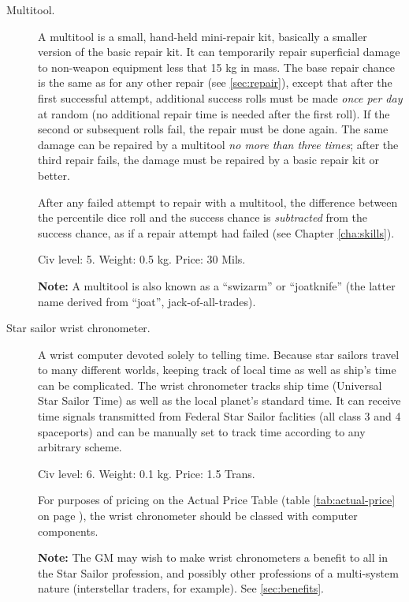 \begin{description}
\item[Multitool.] A multitool is a small, hand-held mini-repair kit,
  basically a smaller version of the basic repair kit.  It can
  temporarily repair superficial damage to non-weapon equipment less
  that 15 kg in mass.  The base repair chance is the same as for any
  other repair (see \ref{sec:repair}), except that after the first
  successful attempt, additional success rolls must be made \emph{once
    per day} at random (no additional repair time is needed after the
  first roll). If the second or subsequent rolls fail, the repair must
  be done again. The same damage can be repaired by a multitool
  \emph{no more than three times}; after the third repair fails, the
  damage must be repaired by a basic repair kit or better.

  After any failed attempt to repair with a multitool, the difference
  between the percentile dice roll and the success chance is
  \emph{subtracted} from the success chance, as if a repair attempt
  had failed (see Chapter \ref{cha:skills}).

  Civ level: 5.  Weight:
  0.5 kg.  Price: 30 Mils.

  \textbf{Note:} A multitool is also known as a ``swizarm'' or
  ``joatknife'' (the latter name derived from ``joat'',
  jack-of-all-trades).

\item[Star sailor wrist chronometer.] A wrist computer devoted solely
  to telling time.  Because star sailors travel to many different
  worlds, keeping track of local time as well as ship's time can be
  complicated.  The wrist chronometer tracks ship time (Universal Star
  Sailor Time) as well as the local planet's standard time.  It can
  receive time signals transmitted from Federal Star Sailor faclities
  (all class 3 and 4 spaceports) and can be manually set to track time
  according to any arbitrary scheme.

  Civ level: 6.  Weight: 0.1 kg. Price: 1.5 Trans.

  For purposes of pricing on the Actual Price Table (table
  \ref{tab:actual-price} on page \pageref{tab:actual-price}), the
  wrist chronometer should be classed with computer components.

  \textbf{Note:} The GM may wish to make wrist chronometers a benefit
  to all in the Star Sailor profession, and possibly other professions
  of a multi-system nature (interstellar traders, for example). See
  \ref{sec:benefits}.

\end{description}


